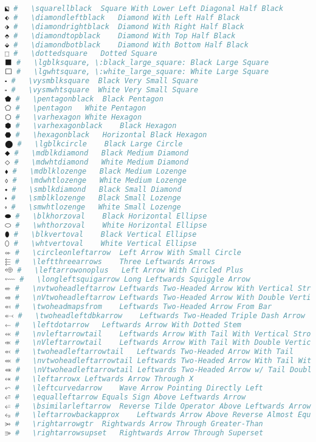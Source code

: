 \begin{lstlisting}[language=Julia, style=julia, linewidth=\textwidth]
⬕ #   \squarellblack  Square With Lower Left Diagonal Half Black
⬖ #   \diamondleftblack   Diamond With Left Half Black
⬗ #   \diamondrightblack  Diamond With Right Half Black
⬘ #   \diamondtopblack    Diamond With Top Half Black
⬙ #   \diamondbotblack    Diamond With Bottom Half Black
⬚ #   \dottedsquare   Dotted Square
⬛ #   \lgblksquare, \:black_large_square: Black Large Square
⬜ #   \lgwhtsquare, \:white_large_square: White Large Square
⬝ #   \vysmblksquare  Black Very Small Square
⬞ #   \vysmwhtsquare  White Very Small Square
⬟ #   \pentagonblack  Black Pentagon
⬠ #   \pentagon   White Pentagon
⬡ #   \varhexagon White Hexagon
⬢ #   \varhexagonblack    Black Hexagon
⬣ #   \hexagonblack   Horizontal Black Hexagon
⬤ #   \lgblkcircle    Black Large Circle
⬥ #   \mdblkdiamond   Black Medium Diamond
⬦ #   \mdwhtdiamond   White Medium Diamond
⬧ #   \mdblklozenge   Black Medium Lozenge
⬨ #   \mdwhtlozenge   White Medium Lozenge
⬩ #   \smblkdiamond   Black Small Diamond
⬪ #   \smblklozenge   Black Small Lozenge
⬫ #   \smwhtlozenge   White Small Lozenge
⬬ #   \blkhorzoval    Black Horizontal Ellipse
⬭ #   \whthorzoval    White Horizontal Ellipse
⬮ #   \blkvertoval    Black Vertical Ellipse
⬯ #   \whtvertoval    White Vertical Ellipse
⬰ #   \circleonleftarrow  Left Arrow With Small Circle
⬱ #   \leftthreearrows    Three Leftwards Arrows
⬲ #   \leftarrowonoplus   Left Arrow With Circled Plus
⬳ #   \longleftsquigarrow Long Leftwards Squiggle Arrow
⬴ #   \nvtwoheadleftarrow Leftwards Two-Headed Arrow With Vertical Stroke
⬵ #   \nVtwoheadleftarrow Leftwards Two-Headed Arrow With Double Vertical Stroke
⬶ #   \twoheadmapsfrom    Leftwards Two-Headed Arrow From Bar
⬷ #   \twoheadleftdbkarrow    Leftwards Two-Headed Triple Dash Arrow
⬸ #   \leftdotarrow   Leftwards Arrow With Dotted Stem
⬹ #   \nvleftarrowtail    Leftwards Arrow With Tail With Vertical Stroke
⬺ #   \nVleftarrowtail    Leftwards Arrow With Tail With Double Vertical Stroke
⬻ #   \twoheadleftarrowtail   Leftwards Two-Headed Arrow With Tail
⬼ #   \nvtwoheadleftarrowtail Leftwards Two-Headed Arrow With Tail With Vertical Stroke
⬽ #   \nVtwoheadleftarrowtail Leftwards Two-Headed Arrow w/ Tail Double Vertical Stroke
⬾ #   \leftarrowx Leftwards Arrow Through X
⬿ #   \leftcurvedarrow    Wave Arrow Pointing Directly Left
⭀ #   \equalleftarrow Equals Sign Above Leftwards Arrow
⭁ #   \bsimilarleftarrow  Reverse Tilde Operator Above Leftwards Arrow
⭂ #   \leftarrowbackapprox    Leftwards Arrow Above Reverse Almost Equal To
⭃ #   \rightarrowgtr  Rightwards Arrow Through Greater-Than
⭄ #   \rightarrowsupset   Rightwards Arrow Through Superset

\end{lstlisting}

